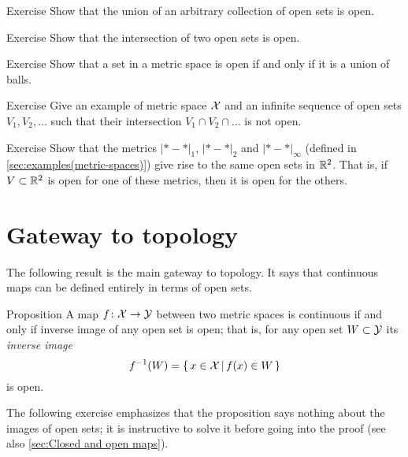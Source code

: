 \begin{thm}{Exercise}\label{ex:open-union}
Show that the union of an arbitrary collection of open sets is open.
\end{thm}

\begin{thm}{Exercise}\label{ex:open-intersection}
Show that the intersection of two open sets is open.
\end{thm}

\begin{thm}{Exercise}\label{ex:union-of-balls}
Show that a set in a metric space is open if and only if it is a union of balls. 
\end{thm}

\begin{thm}{Exercise}\label{ex:infty-open-intersection}
Give an example of metric space $\mathcal{X}$ and an infinite sequence of open sets $V_1,V_2,\dots$
such that their intersection $V_1\cap V_2\cap \dots$ is not open.
\end{thm}

\begin{thm}{Exercise}\label{ex:d1+d2+dinfty-open}
Show that the metrics $|{*}-{*}|_1$, $|{*}-{*}|_2$ and $|{*}-{*}|_\infty$ (defined in \ref{sec:examples(metric-spaces)})
give rise to the same open sets in $\mathbb{R}^2$.
That is, if $V\subset \mathbb{R}^2$ is open for one of these metrics, then it is open for the others.
\end{thm}

\section{Gateway to topology}

The following result is the main gateway to topology.
It says that continuous maps can be defined entirely in terms of open sets.

\begin{thm}{Proposition}\label{prop:cont-open}
A map $f\colon\mathcal{X}\to\mathcal{Y}$ between two metric spaces is continuous if and only if inverse image of any open set is open;
that is, for any open set $W\subset\mathcal{Y}$ its \emph{inverse image}
\[f^{-1}(W)=\left\{\,{x\in \mathcal{X}}\,\middle|\,{f(x)\in W}\,\right\}\]
is open.
\end{thm}

The following exercise emphasizes that the proposition says nothing about the images of open sets;
it is instructive to solve it before going into the proof (see also \ref{sec:Closed and open maps}).

